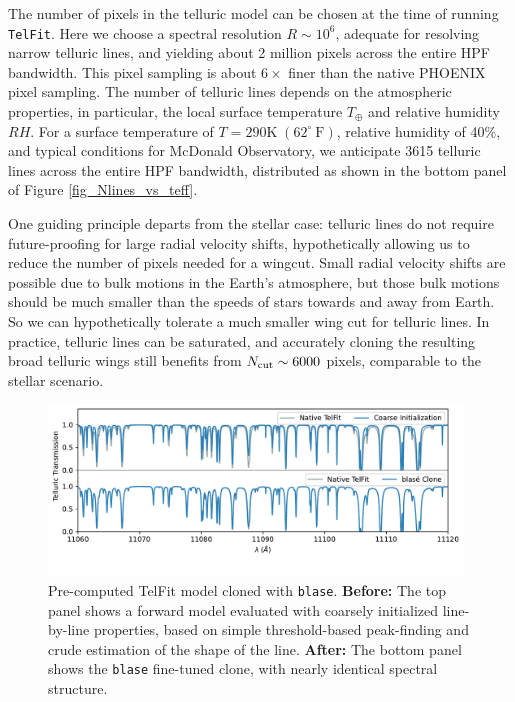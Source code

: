 \documentclass[twocolumn]{aastex631}
\begin{document}
The number of pixels in the telluric model can be chosen at the time of running \texttt{TelFit}.  Here we choose a spectral resolution $R\sim10^6$, adequate for resolving narrow telluric lines, and yielding about 2 million pixels across the entire HPF bandwidth.  This pixel sampling is about $6\times$ finer than the native PHOENIX pixel sampling.  The number of telluric lines depends on the atmospheric properties, in particular, the local surface temperature $T_\oplus$ and relative humidity $RH$.  For a surface temperature of $T=290 \mathrm{K}\; (62^\circ~\mathrm{F})$, relative humidity of 40\%, and typical conditions for McDonald Observatory, we anticipate 3615 telluric lines across the entire HPF bandwidth, distributed as shown in the bottom panel of Figure \ref{fig_Nlines_vs_teff}.

One guiding principle departs from the stellar case: telluric lines do not require future-proofing for large radial velocity shifts, hypothetically allowing us to reduce the number of pixels needed for a wingcut.  Small radial velocity shifts are possible due to bulk motions in the Earth's atmosphere, but those bulk motions should be much smaller than the speeds of stars towards and away from Earth.  So we can hypothetically tolerate a much smaller wing cut for telluric lines.  In practice, telluric lines can be saturated, and accurately cloning the resulting broad telluric wings still benefits from $N_{\rm cut}\sim6000$ pixels, comparable to the stellar scenario.

\begin{figure}[hbt!]
    \centering
    \includegraphics[width=0.98\textwidth]{TelFit_clone_2panel.pdf}
    \caption{Pre-computed TelFit model cloned with \texttt{blase}.  \textbf{Before:} The top panel shows a forward model evaluated with coarsely initialized line-by-line properties, based on simple threshold-based peak-finding and crude estimation of the shape of the line.  \textbf{After:} The bottom panel shows the \texttt{blase} fine-tuned clone, with nearly identical spectral structure.}
    \label{fig_telluric_clone}
\end{figure}
\end{document}
